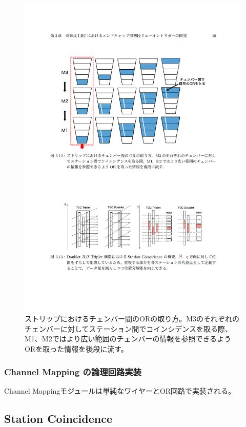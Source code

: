 \begin{figure} 
\centering
\includegraphics[width=16cm]{fig/SL/Channel_Mapping.pdf}
\caption[]{ストリップにおけるチェンバー間のORの取り方\cite{mt_kawamoto}。M3のそれぞれのチェンバーに対してステーション間でコインシデンスを取る際、M1、M2ではより広い範囲のチェンバーの情報を参照できるようORを取った情報を後段に流す。}
\label{Channel_Mapping}
\end{figure}

\subsubsection*{Channel Mapping の論理回路実装}
Channel Mappingモジュールは単純なワイヤーとOR回路で実装される。

\subsection{Station Coincidence}
